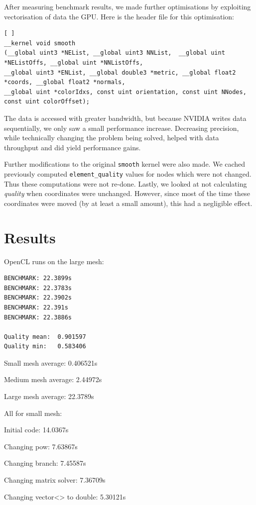 \documentclass[a4paper,11pt, twocolumn]{article}
\begin{document}
After measuring benchmark results, we made further optimisations by exploiting vectorisation of data the GPU.  Here is the header file for this optimisation:
\begin{lstlisting}[ ]
__kernel void smooth
(__global uint3 *NEList, __global uint3 NNList,  __global uint *NEListOffs, __global uint *NNListOffs,
__global uint3 *ENList, __global double3 *metric, __global float2 *coords, __global float2 *normals,
__global uint *colorIdxs, const uint orientation, const uint NNodes, const uint colorOffset);
\end{lstlisting}
The data is accessed with greater bandwidth, but because NVIDIA writes data sequentially, we only saw a small performance increase.  Decreasing precision, while technically changing the problem being solved, helped with data throughput and did yield performance gains.

Further modifications to the original \verb+smooth+ kernel were also made.  We cached previously computed \verb+element_quality+ values for nodes which were not changed.  Thus these computations were not re-done.  Lastly, we looked at not calculating \emph{quality} when coordinates were unchanged.  However, since most of the time these coordinates were moved (by at least a small amount), this had a negligible effect.

\section{Results}

OpenCL runs on the large mesh:
\begin{verbatim}
BENCHMARK: 22.3899s
BENCHMARK: 22.3783s
BENCHMARK: 22.3902s
BENCHMARK: 22.391s
BENCHMARK: 22.3886s

Quality mean:  0.901597
Quality min:   0.583406
\end{verbatim}

Small mesh average: 0.406521s

Medium mesh average: 2.44972s

Large mesh average: 22.3789s

All for small mesh:

Initial code: 14.0367s

Changing pow: 7.63867s

Changing branch: 7.45587s

Changing matrix solver: 7.36709s

Changing vector<> to double: 5.30121s
\end{document}
